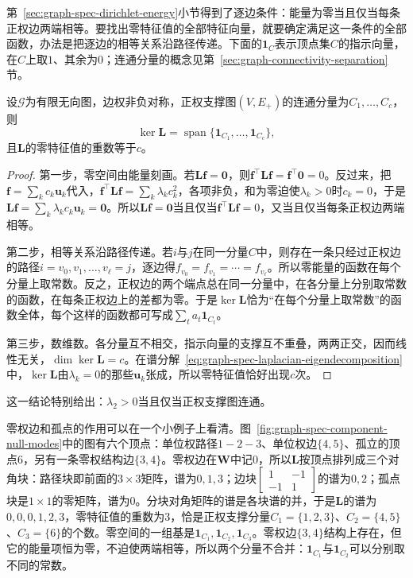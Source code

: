 第~\ref{sec:graph-spec-dirichlet-energy}小节得到了逐边条件：能量为零当且仅当每条正权边两端相等。要找出零特征值的全部特征向量，就要确定满足这一条件的全部函数，办法是把逐边的相等关系沿路径传递。下面的$\bm1_C$表示顶点集$C$的指示向量，在$C$上取$1$、其余为$0$；连通分量的概念见第~\ref{sec:graph-connectivity-separation}节。

\begin{theorem}[零空间与正权支撑分量]
\label{thm:graph-spec-null-space}
设$\mathcal G$为有限无向图，边权非负对称，正权支撑图$(V,E_+)$的连通分量为$C_1,\ldots,C_c$，则
\[
 \ker\bm L=\operatorname{span}\{\bm1_{C_1},\ldots,\bm1_{C_c}\},
\]
且$\bm L$的零特征值的重数等于$c$。
\end{theorem}

\begin{proof}
第一步，零空间由能量刻画。若$\bm L\bm f=\bm0$，则$\bm f^{\top}\bm L\bm f=\bm f^{\top}\bm0=0$。反过来，把$\bm f=\sum_kc_k\bm u_k$代入，$\bm f^{\top}\bm L\bm f=\sum_k\lambda_kc_k^2$，各项非负，和为零迫使$\lambda_k>0$时$c_k=0$，于是$\bm L\bm f=\sum_k\lambda_kc_k\bm u_k=\bm0$。所以$\bm L\bm f=\bm0$当且仅当$\bm f^{\top}\bm L\bm f=0$，又当且仅当每条正权边两端相等。

第二步，相等关系沿路径传递。若$i$与$j$在同一分量$C$中，则存在一条只经过正权边的路径$i=v_0,v_1,\ldots,v_\ell=j$，逐边得$f_{v_0}=f_{v_1}=\cdots=f_{v_\ell}$。所以零能量的函数在每个分量上取常数。反之，正权边的两个端点总在同一分量中，在各分量上分别取常数的函数，在每条正权边上的差都为零。于是$\ker\bm L$恰为“在每个分量上取常数”的函数全体，每个这样的函数都可写成$\sum_ta_t\bm1_{C_t}$。

第三步，数维数。各分量互不相交，指示向量的支撑互不重叠，两两正交，因而线性无关，$\dim\ker\bm L=c$。在谱分解~\eqref{eq:graph-spec-laplacian-eigendecomposition}中，$\ker\bm L$由$\lambda_k=0$的那些$\bm u_k$张成，所以零特征值恰好出现$c$次。
\end{proof}

这一结论特别给出：$\lambda_2>0$当且仅当正权支撑图连通。

零权边和孤点的作用可以在一个小例子上看清。图~\ref{fig:graph-spec-component-null-modes}中的图有六个顶点：单位权路径$1-2-3$、单位权边$\{4,5\}$、孤立的顶点$6$，另有一条零权结构边$\{3,4\}$。零权边在$\bm W$中记$0$，所以$\bm L$按顶点排列成三个对角块：路径块即前面的$3\times3$矩阵，谱为$0,1,3$；边块$\begin{bmatrix}1&-1\\-1&1\end{bmatrix}$的谱为$0,2$；孤点块是$1\times1$的零矩阵，谱为$0$。分块对角矩阵的谱是各块谱的并，于是$\bm L$的谱为$0,0,0,1,2,3$，零特征值的重数为$3$，恰是正权支撑分量$C_1=\{1,2,3\}$、$C_2=\{4,5\}$、$C_3=\{6\}$的个数。零空间的一组基是$\bm1_{C_1},\bm1_{C_2},\bm1_{C_3}$。零权边$\{3,4\}$结构上存在，但它的能量项恒为零，不迫使两端相等，所以两个分量不合并：$\bm1_{C_1}$与$\bm1_{C_2}$可以分别取不同的常数。

